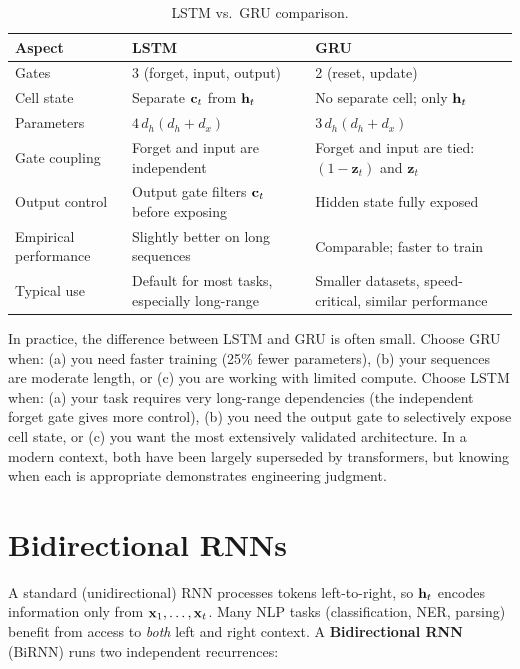 \begin{table}[H]
\centering
\caption{LSTM vs.\ GRU comparison.}
\label{tab:lstm_gru}
\begin{tabularx}{\textwidth}{lXX}
\toprule
\textbf{Aspect} & \textbf{LSTM} & \textbf{GRU} \\
\midrule
Gates & 3 (forget, input, output) & 2 (reset, update) \\
Cell state & Separate $\mathbf{c}_t$ from $\mathbf{h}_t$ & No separate cell; only $\mathbf{h}_t$ \\
Parameters & $4\,d_h(d_h + d_x)$ & $3\,d_h(d_h + d_x)$ \\
Gate coupling & Forget and input are independent & Forget and input are tied: $(1-\mathbf{z}_t)$ and $\mathbf{z}_t$ \\
Output control & Output gate filters $\mathbf{c}_t$ before exposing & Hidden state fully exposed \\
Empirical performance & Slightly better on long sequences & Comparable; faster to train \\
Typical use & Default for most tasks, especially long-range & Smaller datasets, speed-critical, similar performance \\
\bottomrule
\end{tabularx}
\end{table}

\begin{keyinsight}
In practice, the difference between LSTM and GRU is often small.  Choose GRU
when: (a) you need faster training (25\% fewer parameters), (b) your
sequences are moderate length, or (c) you are working with limited compute.
Choose LSTM when: (a) your task requires very long-range dependencies (the
independent forget gate gives more control), (b) you need the output gate to
selectively expose cell state, or (c) you want the most extensively validated
architecture.  In a modern context, both have been largely superseded by
transformers, but knowing when each is appropriate demonstrates engineering
judgment.
\end{keyinsight}


\section{Bidirectional RNNs}
\label{sec:birnn}

A standard (unidirectional) RNN processes tokens left-to-right, so $\mathbf{h}_t$
encodes information only from $\mathbf{x}_1, \ldots, \mathbf{x}_t$.  Many NLP tasks
(classification, NER, parsing) benefit from access to \emph{both} left
and right context.  A \textbf{Bidirectional RNN} (BiRNN) runs two
independent recurrences:


